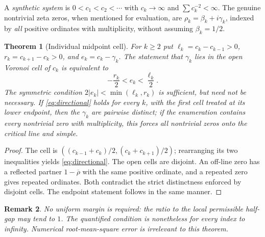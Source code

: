 \documentclass[11pt,a4paper]{article}
\numberwithin{equation}{section}
\newtheorem{theorem}{Theorem}[section]
\newtheorem{remark}[theorem]{Remark}
\begin{document}
A \emph{synthetic system} is $0<c_1<c_2<\cdots$ with $c_k\to\infty$ and $\sum c_k^{-2}<\infty$. The genuine nontrivial zeta zeros, when mentioned for evaluation, are $\rho_k=\beta_k+i\gamma_k$, indexed by \emph{all} positive ordinates with multiplicity, without assuming $\beta_k=1/2$.

\begin{theorem}[Individual midpoint cell]\label{thm:cell}
For $k\ge2$ put $\ell_k=c_k-c_{k-1}>0$, $r_k=c_{k+1}-c_k>0$, and $e_k=c_k-\gamma_k$. The statement that $\gamma_k$ lies in the open Voronoi cell of $c_k$ is \emph{equivalent} to
\begin{equation}\label{eq:directional}
-\frac{r_k}{2}<e_k<\frac{\ell_k}{2}.
\end{equation}
The symmetric condition $2|e_k|<\min(\ell_k,r_k)$ is sufficient, but need not be necessary. If \eqref{eq:directional} holds for every $k$, with the first cell treated at its lower endpoint, then the $\gamma_k$ are pairwise distinct; if the enumeration contains every nontrivial zero with multiplicity, this forces all nontrivial zeros onto the critical line and simple.
\end{theorem}
\begin{proof}
The cell is $((c_{k-1}+c_k)/2,(c_k+c_{k+1})/2)$; rearranging its two inequalities yields \eqref{eq:directional}. The open cells are disjoint. An off-line zero has a reflected partner $1-\overline\rho$ with the same positive ordinate, and a repeated zero gives repeated ordinates. Both contradict the strict distinctness enforced by disjoint cells. The endpoint statement follows in the same manner.
\end{proof}
\begin{remark}
No uniform margin is required: the ratio to the local permissible half-gap may tend to $1$. The quantified condition is nonetheless \emph{for every index to infinity}. Numerical root-mean-square error is irrelevant to this theorem.
\end{remark}
\end{document}
